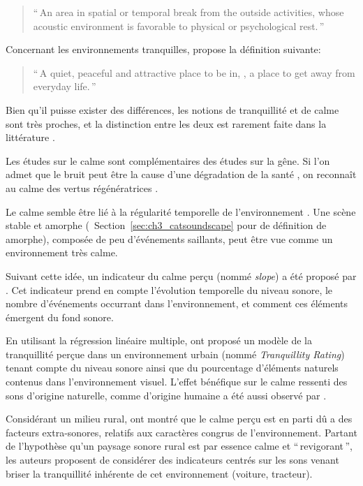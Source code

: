 \begin{quote}
``\,An area in spatial or temporal break from the outside activities, whose acoustic environment is favorable to physical or psychological rest.\,''
\end{quote}

Concernant les environnements tranquilles, \citep{pheasant2008acoustic} propose la définition suivante:

\begin{quote}
``\,A quiet, peaceful and attractive place to be in, \ie, a place to get away from everyday life.\,''
\end{quote}

Bien qu'il puisse exister des différences, les notions de tranquillité et de calme sont très proches, et la distinction entre les deux  est rarement faite dans la littérature \citep{delaitre2012definition}. 

Les études sur le calme sont complémentaires des études sur la gêne. Si l'on admet que le bruit peut être la cause d'une dégradation de la santé \citep{stansfeld2005aircraft}, on reconnaît au calme des vertus régénératrices \citep{payne2013production,de2006quiet}.

Le calme semble être lié à la régularité temporelle de l'environnement \citep{delaitre2012definition}. Une scène stable et amorphe (\cf~Section~\ref{sec:ch3_catsoundscape} pour de définition de amorphe), composée de peu d'événements saillants, peut être vue comme un environnement très calme. 

Suivant cette idée, un indicateur du calme perçu (nommé \emph{slope}) a été proposé par \citep{memoli2008soundscape}. Cet indicateur prend en compte l'évolution temporelle du niveau sonore, le nombre d'événements occurrant dans l'environnement, et comment ces éléments émergent du fond sonore. 

En utilisant la régression linéaire multiple, \citep{pheasant2008acoustic,pheasant2009validation} ont proposé un modèle de la tranquillité perçue dans un environnement urbain (nommé \emph{Tranquillity Rating}) tenant compte du niveau sonore ainsi que du pourcentage d'éléments naturels contenus dans l'environnement visuel. L'effet bénéfique sur le calme ressenti des sons d'origine naturelle, comme d'origine humaine a été aussi observé par \citep{de2013characterizing}.

Considérant un milieu rural, \citep{de2006quiet} ont montré que le calme perçu est en parti dû a des facteurs extra-sonores, relatifs aux caractères congrus de l'environnement. Partant de l'hypothèse qu'un paysage sonore rural est par essence calme et ``\,revigorant\,'', les auteurs proposent de considérer des indicateurs centrés sur les sons venant briser la tranquillité inhérente de cet environnement (voiture, tracteur).

